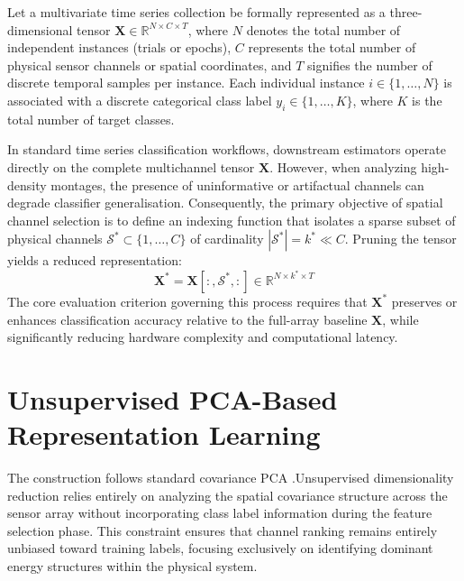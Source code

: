 \noindent
Let a multivariate time series collection be formally represented as a three-dimensional tensor $\mathbf{X} \in \mathbb{R}^{N \times C \times T}$, where $N$ denotes the total number of independent instances (trials or epochs), $C$ represents the total number of physical sensor channels or spatial coordinates, and $T$ signifies the number of discrete temporal samples per instance. Each individual instance $i \in \{1, \dots, N\}$ is associated with a discrete categorical class label $y_i \in \{1, \dots, K\}$, where $K$ is the total number of target classes. 

\noindent
In standard time series classification workflows, downstream estimators operate directly on the complete multichannel tensor $\mathbf{X}$. However, when analyzing high-density montages, the presence of uninformative or artifactual channels can degrade classifier generalisation. Consequently, the primary objective of spatial channel selection is to define an indexing function that isolates a sparse subset of physical channels $\mathcal{S}^* \subset \{1, \dots, C\}$ of cardinality $|\mathcal{S}^*| = k^* \ll C$. Pruning the tensor yields a reduced representation:
\begin{equation}
    \mathbf{X}^* = \mathbf{X}[:, \mathcal{S}^* , :] \in \mathbb{R}^{N \times k^* \times T}
\end{equation}
The core evaluation criterion governing this process requires that $\mathbf{X}^*$ preserves or enhances classification accuracy relative to the full-array baseline $\mathbf{X}$, while significantly reducing hardware complexity and computational latency.

\section{Unsupervised PCA-Based Representation Learning}
\label{sec:unsupervised_pca}

\noindent
The construction follows standard covariance PCA
\citep{jolliffe2002pca,jolliffe2016pca}.Unsupervised dimensionality reduction relies entirely on analyzing the spatial covariance structure across the sensor array without incorporating class label information during the feature selection phase. This constraint ensures that channel ranking remains entirely unbiased toward training labels, focusing exclusively on identifying dominant energy structures within the physical system.

